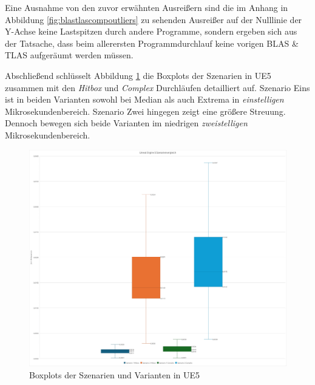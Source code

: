 \documentclass[11pt]{scrartcl}
\begin{document}
	Eine Ausnahme von den zuvor erwähnten Ausreißern sind die im Anhang in Abbildung \ref{fig:blastlascompoutliers} zu sehenden Ausreißer auf der Nulllinie der Y-Achse keine Lastspitzen durch andere Programme, sondern ergeben sich aus der Tatsache, dass beim allerersten Programmdurchlauf keine vorigen BLAS \& TLAS aufgeräumt werden müssen.
	
	\pagebreak
	
	Abschließend schlüsselt Abbildung \ref{fig:ue5comp} die Boxplots der Szenarien in UE5 zusammen mit den \textit{Hitbox} und \textit{Complex} Durchläufen detailliert auf.
	Szenario Eins ist in beiden Varianten sowohl bei Median als auch Extrema in \textit{einstelligen} Mikrosekundenbereich. Szenario Zwei hingegen zeigt eine größere Streuung. Dennoch bewegen sich beide Varianten im niedrigen \textit{zweistelligen} Mikrosekundenbereich.
	
	\begin{figure}[h!]
		\centering
		\includegraphics[width=1\linewidth]{Figures/rt_ue5_full_comp.png}
		\caption[Detaillierter Szenarienvergleich in UE5]{Boxplots der Szenarien und Varianten in UE5}
		\label{fig:ue5comp}
	\end{figure}
	
	
	\pagebreak
\end{document}
